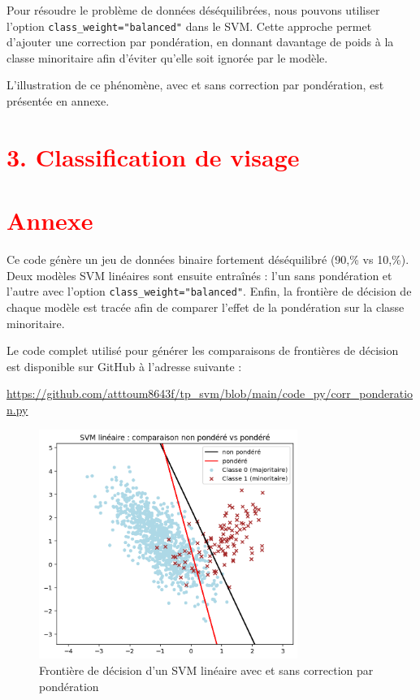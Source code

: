 \documentclass[
  12pt,
]{article}
\begin{document}
Pour résoudre le problème de données déséquilibrées, nous pouvons
utiliser l'option \texttt{class\_weight="balanced"} dans le SVM. Cette
approche permet d'ajouter une correction par pondération, en donnant
davantage de poids à la classe minoritaire afin d'éviter qu'elle soit
ignorée par le modèle.

L'illustration de ce phénomène, avec et sans correction par pondération,
est présentée en annexe.

\section{\texorpdfstring{\textcolor{red}{3. Classification de visage}}{}}\label{section-5}

\newpage

\section{\texorpdfstring{\textcolor{red}{Annexe}}{}}\label{section-6}

Ce code génère un jeu de données binaire fortement déséquilibré (90,\%
vs 10,\%). Deux modèles SVM linéaires sont ensuite entraînés : l'un sans
pondération et l'autre avec l'option \texttt{class\_weight="balanced"}.
Enfin, la frontière de décision de chaque modèle est tracée afin de
comparer l'effet de la pondération sur la classe minoritaire.

Le code complet utilisé pour générer les comparaisons de frontières de
décision est disponible sur GitHub à l'adresse suivante :

\textcolor{blue}{\url{https://github.com/atttoum8643f/tp_svm/blob/main/code_py/corr_ponderation.py}}

\begin{figure}[H]
    \centering
    \includegraphics[width=0.75\textwidth]{vis/pond.png}
    \caption{Frontière de décision d’un SVM linéaire avec et sans correction par pondération}
    \label{fig:avec_sans_pondération}
\end{figure}
\end{document}
